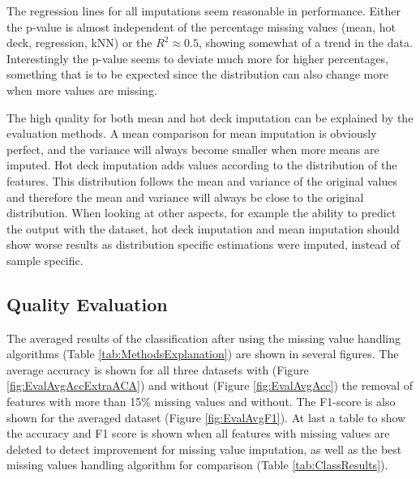 \documentclass[10pt,a4paper]{report}
\begin{document}
	The regression lines for all imputations seem reasonable in performance. Either the p-value is almost independent of the percentage missing values (mean, hot deck, regression, kNN) or the $R^2 \approx 0.5$, showing somewhat of a trend in the data. Interestingly the p-value seems to deviate much more for higher percentages, something that is to be expected since the distribution can also change more when more values are missing.  
	
	The high quality for both mean and hot deck imputation can be explained by the evaluation methods. A mean comparison for mean imputation is obviously perfect, and the variance will always become smaller when more means are imputed. Hot deck imputation adds values according to the distribution of the features. This distribution follows the mean and variance of the original values and therefore the mean and variance will always be close to the original distribution. When looking at other aspects, for example the ability to predict the output with the dataset, hot deck imputation and mean imputation should show worse results as distribution specific estimations were imputed, instead of sample specific.
	
	\subsection{Quality Evaluation}
	\label{MVsubsec:QualityEvaluationResults}
	
	The averaged results of the classification after using the missing value handling algorithms (Table \ref{tab:MethodsExplanation}) are shown in several figures. The average accuracy is shown for all three datasets with (Figure \ref{fig:EvalAvgAccExtraACA}) and without (Figure \ref{fig:EvalAvgAcc}) the removal of features with more than 15\% missing values  and without. The F1-score is also shown for the averaged dataset (Figure \ref{fig:EvalAvgF1}). At last a table to show the accuracy and F1 score is shown when all features with missing values are deleted to detect improvement for missing value imputation, as well as the best missing values handling algorithm for comparison (Table \ref{tab:ClassResults}).
	
\end{document}

